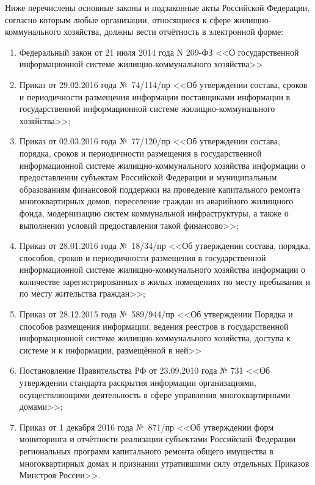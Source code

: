 Ниже перечислены основные законы и подзаконные акты Российской Федерации, согласно которым любые организации, относящиеся к сфере жилищно-коммунального хозяйства, должны вести отчётность в электронной форме:

\begin{enumerate}
	\item Федеральный закон от 21 июля 2014 года N 209-ФЗ <<О государственной информационной системе жилищно-коммунального хозяйства>>
	\item Приказ от 29.02.2016 года №~74/114/пр <<Об утверждении состава, сроков и периодичности размещения информации поставщиками информации в государственной информационной системе жилищно-коммунального хозяйства>>;
	\item Приказ от 02.03.2016 года №~77/120/пр <<Об утверждении состава, порядка, сроков и периодичности размещения в государственной информационной системе жилищно-коммунального хозяйства информации о предоставлении субъектам Российской Федерации и муниципальным образованиям финансовой поддержки на проведение капитального ремонта многоквартирных домов, переселение граждан из аварийного жилищного фонда, модернизацию систем коммунальной инфраструктуры, а также о выполнении условий предоставления такой финансово>>;
	\item Приказ от 28.01.2016 года №~18/34/пр <<Об утверждении состава, порядка, способов, сроков и периодичности размещения в государственной информационной системе жилищно-коммунального хозяйства информации о количестве зарегистрированных в жилых помещениях по месту пребывания и по месту жительства граждан>>;
	\item Приказ от 28.12.2015 года №~589/944/пр <<Об утверждении Порядка и способов размещения информации, ведения реестров в государственной информационной системе жилищно-коммунального хозяйства, доступа к системе и к информации, размещённой в ней>>
	\item Постановление Правительства РФ от 23.09.2010 года № 731 <<Об утверждении стандарта раскрытия информации организациями, осуществляющими деятельность в сфере управления многоквартирными домами>>;
	\item Приказ от 1 декабря 2016 года №~871/пр <<Об утверждении форм мониторинга и отчётности реализации субъектами Российской Федерации региональных программ капитального ремонта общего имущества в многоквартирных домах и признании утратившими силу отдельных Приказов Минстроя России>>.
\end{enumerate}

